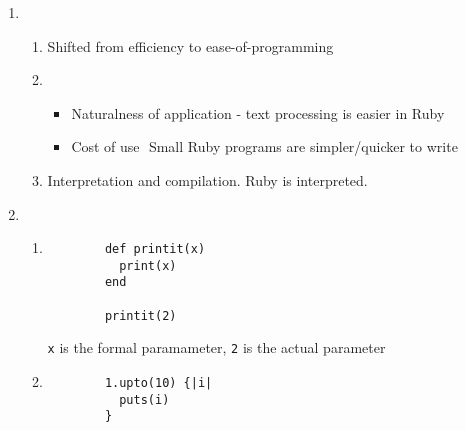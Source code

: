 \documentclass[11pt]{article}
\begin{document}

  \begin{enumerate}

    \addtolength{\itemsep}{6mm}

    \item \begin{enumerate}

            \addtolength{\itemsep}{3mm}

            \item Shifted from efficiency to ease-of-programming

            \item \begin{itemize}

                    \addtolength{\itemsep}{2mm}

                    \item Naturalness of application -­ text processing is
                          easier in Ruby

                    \item Cost of use ­ Small Ruby programs are
                          simpler/quicker to write

                  \end{itemize}

            \item Interpretation and compilation.  Ruby is interpreted.

          \end{enumerate}

    \item \begin{enumerate}

            \addtolength{\itemsep}{3mm}

            \item \begin{Verbatim}
        def printit(x)
          print(x)
        end

        printit(2)
                  \end{Verbatim}

                   \texttt{x} is the formal paramameter, \texttt{2} is the
                   actual parameter

             \item \begin{multicols}{3}

                     \begin{Verbatim}
        1.upto(10) {|i|
          puts(i)
        }
                     \end{Verbatim}


\end{multicols}
\end{enumerate}
\end{enumerate}
\end{document}
